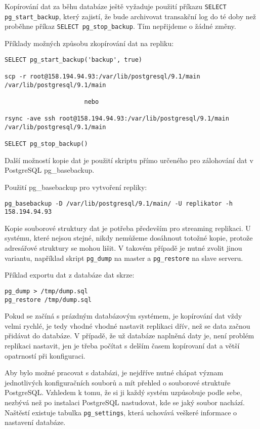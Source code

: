 Kopírování dat za běhu databáze ještě vyžaduje použití příkazu \texttt{SELECT pg\_start\_backup}, který zajistí, že bude archivovat transakční log do té doby než proběhne příkaz \texttt{SELECT pg\_stop\_backup}. Tím nepřijdeme o žádné změny.

Příklady možných způsobu zkopírování dat na repliku:

\begin{lstlisting}
SELECT pg_start_backup('backup', true)

scp -r root@158.194.94.93:/var/lib/postgresql/9.1/main /var/lib/postgresql/9.1/main

                      nebo

rsync -ave ssh root@158.194.94.93:/var/lib/postgresql/9.1/main /var/lib/postgresql/9.1/main

SELECT pg_stop_backup()
\end{lstlisting}

Další možností kopie dat je použití skriptu přímo určeného pro zálohování dat v PostgreSQL pg\_basebackup. 

Použití pg\_basebackup pro vytvoření repliky:

\begin{lstlisting}
pg_basebackup -D /var/lib/postgresql/9.1/main/ -U replikator -h 158.194.94.93
\end{lstlisting}

Kopie souborové struktury dat je potřeba především pro streaming replikaci. U systému, které nejsou stejné, nikdy nemůžeme dosáhnout totožné kopie, protože adresářové struktury se mohou lišit. V takovém případě je nutné zvolit jinou variantu, například skript \texttt{pg\_dump} na master a \texttt{pg\_restore} na slave serveru. 

Příklad exportu dat z databáze dat skrze:
\begin{lstlisting}
pg_dump > /tmp/dump.sql
pg_restore /tmp/dump.sql
\end{lstlisting}

Pokud se začíná s prázdným databázovým systémem, je kopírování dat vždy velmi rychlé, je tedy vhodné vhodné nastavit replikaci dřív, než se data začnou přidávat do databáze. V případě, že už databáze naplněná daty je, není problém replikaci nastavit, jen je třeba počítat s delším časem kopírovaní dat a větší opatrností při konfiguraci. 

Aby bylo možné pracovat s databázi, je nejdříve nutné chápat význam jednotlivých konfiguračních souborů a mít přehled o souborové struktuře PostgreSQL. Vzhledem k tomu, že si ji každý systém uzpůsobuje podle sebe, nezbývá než po instalaci PostgreSQL nastudovat, kde se jaký soubor nachází. Naštěstí existuje tabulka \texttt{pg\_settings}, která uchovává veškeré informace o nastavení databáze. 

